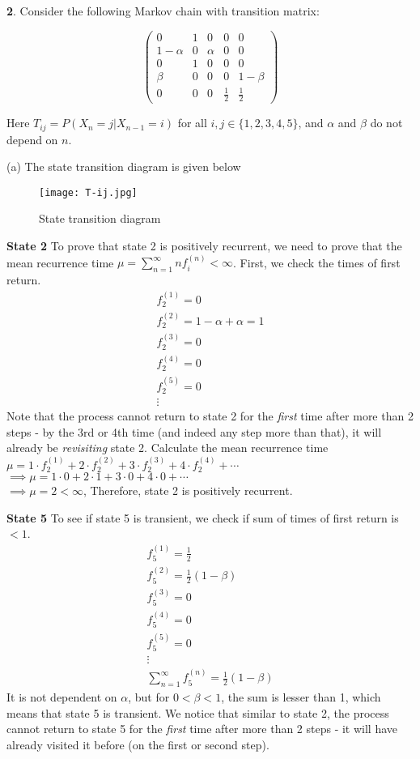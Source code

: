 \textbf{2}. Consider the following Markov chain with transition matrix:

\[
\begin{pmatrix}
  0 & 1 & 0 & 0 & 0 \\
  1-\alpha & 0 & \alpha & 0 & 0 \\
  0 & 1 & 0 & 0 & 0 \\
  \beta & 0 & 0 & 0 & 1-\beta \\
  0 & 0 & 0 & \frac{1}{2} & \frac{1}{2}
\end{pmatrix}
\]

Here $T_{ij} = P(X_n = j | X_{n-1} = i)$ for all $i,j \in \{1,2,3,4,5\}$, and $\alpha$ and $\beta$ do not depend on $n$. 

(a) The state transition diagram is given below
\begin{figure}[H]
\centering
\texttt{[image: T-ij.jpg]}
\caption{\label{fig:T-ij}State transition diagram}
\end{figure}
\textbf{State 2}
To prove that state 2 is positively recurrent, we need to prove that the mean recurrence time $\mu=\sum_{n=1}^{\infty}nf_{i}^{(n)} < \infty$. First, we check the times of first return.
\begin{gather*}
f_2^{(1)} = 0 \\
f_2^{(2)} = 1 - \alpha + \alpha = 1\\
f_2^{(3)} = 0 \\
f_2^{(4)} = 0 \\
f_2^{(5)} = 0 \\
\vdots 
\end{gather*}
Note that the process cannot return to state 2 for the \textit{first} time after more than 2 steps - by the 3rd or 4th time (and indeed any step more than that), it will already be \textit{revisiting} state 2. Calculate the mean recurrence time $\mu= 1\cdot f_{2}^{(1)} + 2\cdot f_{2}^{(2)} + 3\cdot f_{2}^{(3)} + 4\cdot f_{2}^{(4)} + \cdots$\\
$\implies \mu = 1\cdot 0 + 2\cdot 1 + 3\cdot 0 + 4\cdot 0 + \cdots$\\
$\implies \mu = 2 < \infty$,
Therefore, state 2 is positively recurrent.

\textbf{State 5} To see if state 5 is transient, we check if sum of times of first return is $< 1$.
\begin{gather*}
f_5^{(1)} = \frac{1}{2} \\
f_5^{(2)} = \frac{1}{2}(1 - \beta) \\
f_5^{(3)} = 0 \\
f_5^{(4)} = 0 \\
f_5^{(5)} = 0 \\
\vdots\\
\sum_{n=1}^{\infty}f_{5}^{(n)} = \frac{1}{2}(1 - \beta)
\end{gather*}
It is not dependent on $\alpha$, but for $0<\beta<1$, the sum is lesser than 1, which means that state 5 is transient. We notice that similar to state 2, the process cannot return to state 5 for the \textit{first} time after more than 2 steps - it will have already visited it before (on the first or second step).

